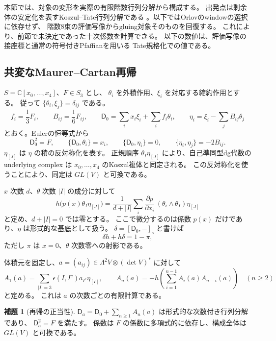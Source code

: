 \documentclass[a4paper,11pt]{ltjsarticle}
\theoremstyle{definition}
\newtheorem{lemma}[theorem]{補題}
\newcommand{\CC}{\mathbb C}
\begin{document}
本節では、対象の変形を実際の有限階数行列分解から構成する。
出発点は剰余体の安定化を表すKoszul--Tate行列分解である
\cite[\S\S 2.3, 4.1]{DyckerhoffMF}。以下ではOrlovのwindowの選択に依存せず、
階数8束の評価写像からgluing対象そのものを回復する。
これにより、前節で未決定であった十次係数を計算できる。
以下の数値は、評価写像の接座標と通常の符号付きPfaffianを用いる
Tate規格化での値である。

\subsection{共変なMaurer--Cartan再帰}

$S=\CC[x_0,\ldots,x_4]$、$F\in S_3$ とし、
$\theta_i$ を外積作用、$\xi_i$ を対応する縮約作用とする。
従って $\{\theta_i,\xi_j\}=\delta_{ij}$ である。
\[
 f_i=\frac13F_i,\qquad B_{ij}=\frac16F_{ij},\qquad
 \mathsf D_0=\sum_i x_i\xi_i+\sum_i f_i\theta_i,
 \qquad \eta_i=\xi_i-\sum_jB_{ij}\theta_j
\]
とおく。Eulerの恒等式から
\[
 \mathsf D_0^2=F,\qquad \{\mathsf D_0,\theta_i\}=x_i,\qquad
 \{\mathsf D_0,\eta_i\}=0,\qquad \{\eta_i,\eta_j\}=-2B_{ij}.
 \tag{T1}\label{eq:tate-clifford-relations}
\]
$\eta_{[J]}$ は $\eta$ の積の反対称化を表す。
正規順序 $\theta_I\eta_{[J]}$ により、自己準同型dg代数の underlying
complex は $x_0,\ldots,x_4$ のKoszul複体と同定される。
この反対称化を使うことにより、同定は $GL(V)$ と可換である。

$x$ 次数 $d$、$\theta$ 次数 $|I|$ の成分に対して
\[
 h\bigl(p(x)\theta_I\eta_{[J]}\bigr)
 =\frac1{d+|I|}\sum_i
   \frac{\partial p}{\partial x_i}\,
   (\theta_i\wedge\theta_I)\eta_{[J]}
 \tag{T2}\label{eq:tate-homotopy}
\]
と定め、$d+|I|=0$ では零とする。
ここで微分するのは係数 $p(x)$ だけであり、$\eta$ は形式的な基底として扱う。
$\delta=[\mathsf D_0,-]_{\mathrm s}$ と書けば
\[
 \delta h+h\delta=1-\pi,
\]
ただし $\pi$ は $x=0$、$\theta$ 次数零への射影である。

体積元を固定し、$a=(a_{ij})\in\Lambda^2V\otimes(\det V)^*$ に対して
\[
 A_1(a)=\sum_{|I|=3}\epsilon(I,I^c)a_{I^c}\eta_{[I]},
 \qquad
 A_n(a)=-h\left(\sum_{i=1}^{n-1}A_i(a)A_{n-i}(a)\right)
 \quad(n\ge2)
 \tag{T3}\label{eq:tate-mc-recurrence}
\]
と定める。
これは $a$ の次数ごとの有限計算である。

\begin{lemma}[再帰の正当性]\label{lem:tate-mc-existence}
$\mathsf D_a=\mathsf D_0+\sum_{n\ge1}A_n(a)$ は形式的な次数付き行列分解であり、
$\mathsf D_a^2=F$ を満たす。
係数は $F$ の係数に多項式的に依存し、構成全体は $GL(V)$ と可換である。
\end{lemma}
\end{document}
